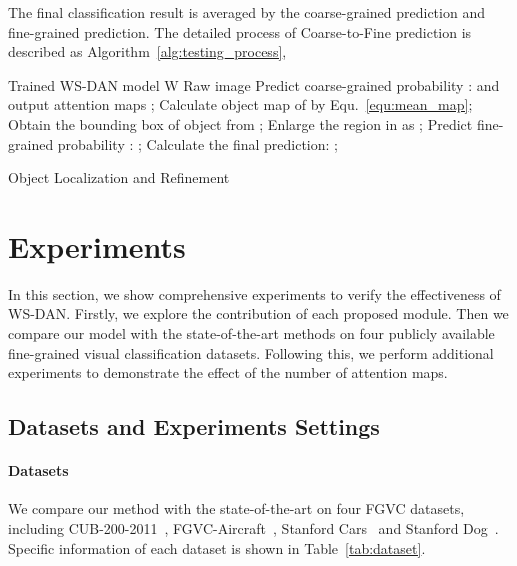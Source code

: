 \documentclass[10pt,twocolumn,letterpaper]{article}
\begin{document}
The final classification result is averaged by the coarse-grained prediction and fine-grained prediction. The detailed process of Coarse-to-Fine prediction is described as Algorithm~\ref{alg:testing_process},
\begin{algorithm}[h]
    \begin{algorithmic}[1]
        \REQUIRE Trained WS-DAN model W
        \REQUIRE Raw image 
        \STATE Predict coarse-grained probability :  and output attention maps ;
        \STATE Calculate object map  of  by Equ.~\ref{equ:mean_map};
        \STATE Obtain the bounding box  of object from ;
        \STATE Enlarge the region in  as ;
        \STATE Predict fine-grained probability :  ;
        \STATE Calculate the final prediction: ;
        \RETURN 
    \end{algorithmic}
    \caption{Object Localization and Refinement}
    \label{alg:testing_process}
\end{algorithm}

\section{Experiments}
\label{sec:experiments}
In this section, we show comprehensive experiments to verify the effectiveness of WS-DAN. Firstly, we explore the contribution of each proposed module. Then we compare our model with the state-of-the-art methods on four publicly available fine-grained visual classification datasets. Following this, we perform additional experiments to demonstrate the effect of the number of attention maps.
\subsection{Datasets and Experiments Settings}
\paragraph{Datasets} We compare our method with the state-of-the-art on four FGVC datasets, including CUB-200-2011~\cite{CUB_200_2011}, FGVC-Aircraft~\cite{fgvc_aircraft}, Stanford Cars~\cite{Stanford_car} and Stanford Dog~\cite{stanford_dog}. Specific information of each dataset is shown in Table~\ref{tab:dataset}.
\end{document}
